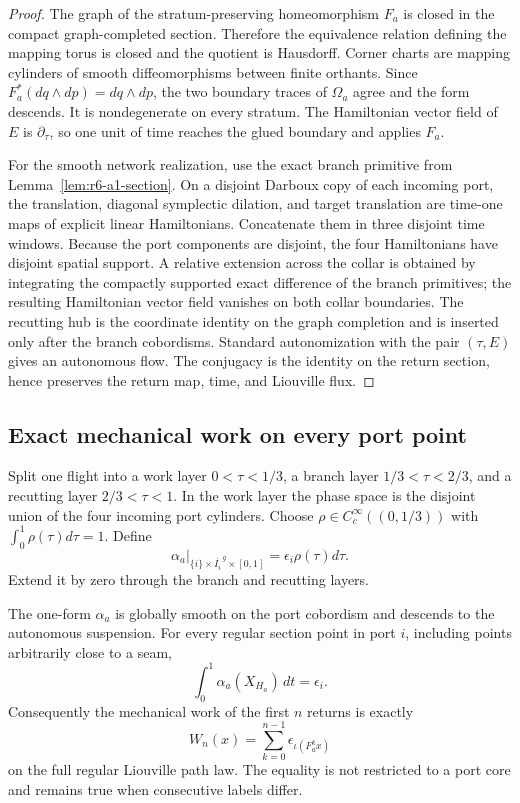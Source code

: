 \begin{proof}
The graph of the stratum-preserving homeomorphism \(F_a\) is closed in the
compact graph-completed section.  Therefore the equivalence relation defining
the mapping torus is closed and the quotient is Hausdorff.  Corner charts are
mapping cylinders of smooth diffeomorphisms between finite orthants.  Since
\(F_a^*(dq\wedge dp)=dq\wedge dp\), the two boundary traces of \(\Omega_a\)
agree and the form descends.  It is nondegenerate on every stratum.  The
Hamiltonian vector field of \(E\) is \(\partial_\tau\), so one unit of time
reaches the glued boundary and applies \(F_a\).

For the smooth network realization, use the exact branch primitive from
Lemma~\ref{lem:r6-a1-section}.  On a disjoint Darboux copy of each incoming
port, the translation, diagonal symplectic dilation, and target translation
are time-one maps of explicit linear Hamiltonians.  Concatenate them in three
disjoint time windows.  Because the port components are disjoint, the four
Hamiltonians have disjoint spatial support.  A relative extension across the
collar is obtained by integrating the compactly supported exact difference of
the branch primitives; the resulting Hamiltonian vector field vanishes on
both collar boundaries.  The recutting hub is the coordinate identity on the
graph completion and is inserted only after the branch cobordisms.  Standard
autonomization with the pair \((\tau,E)\) gives an autonomous flow.  The
conjugacy is the identity on the return section, hence preserves the return
map, time, and Liouville flux.
\end{proof}

\subsection{Exact mechanical work on every port point}

Split one flight into a work layer \(0<\tau<1/3\), a branch layer
\(1/3<\tau<2/3\), and a recutting layer \(2/3<\tau<1\).  In the work layer
the phase space is the disjoint union of the four incoming port cylinders.
Choose \(\rho\in C_c^\infty((0,1/3))\) with
\(\int_0^1\rho(\tau)d\tau=1\).  Define
\[
\alpha_a|_{\{i\}\times\overline{I_i}^{\,g}\times[0,1]}
=\epsilon_i\rho(\tau)d\tau.
\]
Extend it by zero through the branch and recutting layers.

\begin{proposition}
\label{prop:r6-a1-work}
The one-form \(\alpha_a\) is globally smooth on the port cobordism and
descends to the autonomous suspension.  For every regular section point in
port \(i\), including points arbitrarily close to a seam,
\[
\int_0^1\alpha_a(X_{H_a})\,dt=\epsilon_i.
\]
Consequently the mechanical work of the first \(n\) returns is exactly
\[
W_n(x)=\sum_{k=0}^{n-1}\epsilon_{\iota(F_a^kx)}
\]
on the full regular Liouville path law.  The equality is not restricted to a
port core and remains true when consecutive labels differ.
\end{proposition}

